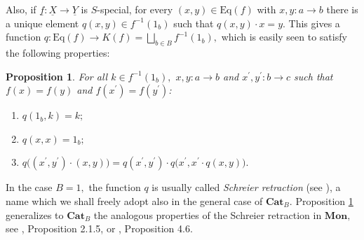 \documentclass[11pt]{amsart}
\theoremstyle{plain}
\newtheorem{proposition}[subsubsection]{Proposition}
\theoremstyle{definition}
\theoremstyle{remark}
\begin{document}
Also, if $\underline{f}\colon\underline{X}\rightarrow\underline{Y}$ is $S$-special, for every $(x,y)\in\mathrm{Eq}(f)$ with $x,y\colon a\rightarrow b$ there is a unique element $q(x,y)\in f^{-1}(1_b)$ such that $q(x,y)\cdot x=y.$ This gives a function $q\colon\mathrm{Eq}(f)\rightarrow K(f)=\bigsqcup_{b\in B}f^{-1}(1_b),$ which is easily seen to satisfy the following properties:
\begin{proposition}
\label{prop:prop_retraction}
For all $k\in f^{-1}(1_b),$ $x,y\colon a\rightarrow b$ and $x^\prime,y^\prime\colon b\rightarrow c$ such that $f(x)=f(y)$ and  $f(x^\prime)=f(y^\prime)$:
\begin{enumerate}
\item $q(1_b,k)=k;$
\item $q(x,x)=1_b;$
\item $q\big((x^\prime,y^\prime)\cdot(x,y)\big)=q(x^\prime,y^\prime)\cdot q\big(x^\prime,x^\prime\cdot q(x,y)\big).$
\end{enumerate}
\end{proposition}
In the case $B=1,$ the function $q$ is usually called \emph{Schreier retraction} (see \cite{schreier_book, S-protomodular}), a name which we shall freely adopt also in the general case of $\mathbf{Cat}_B.$ Proposition \ref{prop:prop_retraction} generalizes to $\mathbf{Cat}_B$ the analogous properties of the Schreier retraction in $\mathbf{Mon},$ see \cite{schreier_book}, Proposition 2.1.5, or \cite{S-protomodular}, Proposition 4.6.
\end{document}
